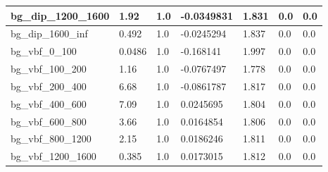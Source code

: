 \documentclass[a4paper, 10pt]{article}
\begin{document}
\begin{table}[H]
\begin{center}
\begin{tabular}{|m{23.0mm}|m{23.0mm}|m{18.0mm}|m{19.0mm}|m{19.0mm}|m{19.0mm}|m{19.0mm}|}
      \hline
      {\cellcolor{white}         bg\_dip\_1200\_1600}& {\cellcolor{white}         1.92}& {\cellcolor{white}         1.0}& {\cellcolor{white}         -0.0349831}& {\cellcolor{white}         1.831}& {\cellcolor{green}         0.0}& {\cellcolor{green}         0.0}\\
      \hline
      {\cellcolor{white}         bg\_dip\_1600\_inf}& {\cellcolor{white}         0.492}& {\cellcolor{white}         1.0}& {\cellcolor{white}         -0.0245294}& {\cellcolor{white}         1.837}& {\cellcolor{green}         0.0}& {\cellcolor{green}         0.0}\\
      \hline
      {\cellcolor{white}         bg\_vbf\_0\_100}& {\cellcolor{white}         0.0486}& {\cellcolor{white}         1.0}& {\cellcolor{white}         -0.168141}& {\cellcolor{white}         1.997}& {\cellcolor{green}         0.0}& {\cellcolor{green}         0.0}\\
      \hline
      {\cellcolor{white}         bg\_vbf\_100\_200}& {\cellcolor{white}         1.16}& {\cellcolor{white}         1.0}& {\cellcolor{white}         -0.0767497}& {\cellcolor{white}         1.778}& {\cellcolor{green}         0.0}& {\cellcolor{green}         0.0}\\
      \hline
      {\cellcolor{white}         bg\_vbf\_200\_400}& {\cellcolor{white}         6.68}& {\cellcolor{white}         1.0}& {\cellcolor{white}         -0.0861787}& {\cellcolor{white}         1.817}& {\cellcolor{green}         0.0}& {\cellcolor{green}         0.0}\\
      \hline
      {\cellcolor{white}         bg\_vbf\_400\_600}& {\cellcolor{white}         7.09}& {\cellcolor{white}         1.0}& {\cellcolor{white}         0.0245695}& {\cellcolor{white}         1.804}& {\cellcolor{green}         0.0}& {\cellcolor{green}         0.0}\\
      \hline
      {\cellcolor{white}         bg\_vbf\_600\_800}& {\cellcolor{white}         3.66}& {\cellcolor{white}         1.0}& {\cellcolor{white}         0.0164854}& {\cellcolor{white}         1.806}& {\cellcolor{green}         0.0}& {\cellcolor{green}         0.0}\\
      \hline
      {\cellcolor{white}         bg\_vbf\_800\_1200}& {\cellcolor{white}         2.15}& {\cellcolor{white}         1.0}& {\cellcolor{white}         0.0186246}& {\cellcolor{white}         1.811}& {\cellcolor{green}         0.0}& {\cellcolor{green}         0.0}\\
      \hline
      {\cellcolor{white}         bg\_vbf\_1200\_1600}& {\cellcolor{white}         0.385}& {\cellcolor{white}         1.0}& {\cellcolor{white}         0.0173015}& {\cellcolor{white}         1.812}& {\cellcolor{green}         0.0}& {\cellcolor{green}         0.0}\\

\end{tabular}
\end{center}
\end{table}
\end{document}
